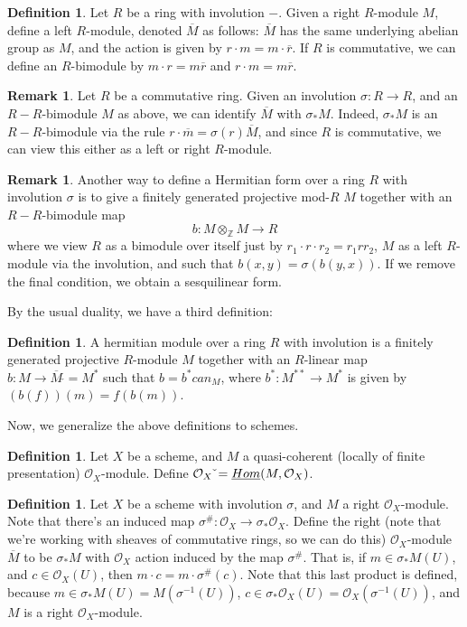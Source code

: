 \documentclass[draftthesis,tocnosub,noragright,centerchapter,10pt]{uiucthesis2009}
\newcommand{\Z}{\mathbb Z}
\newcommand{\mc}{\mathcal}
\newcommand{\dual}{\,\check{}}
\theoremstyle{plain}
\theoremstyle{definition}
\newtheorem{definition}[lemma]{Definition}
\newtheorem{remark}[lemma]{Remark}
\begin{document}
\begin{definition}
Let $R$ be a ring with involution $-$. Given a right $R$-module $M$, define
a left $R$-module, denoted $\overline M$ as follows: $\overline M$ has the same underlying abelian
group as $M$, and the action is given by $r \cdot m = m \cdot \overline r$. If $R$ is
commutative, we can define an $R$-bimodule by $m \cdot r =
m \overline r$ and $r \cdot m = m \overline r$. 
\end{definition}

\begin{remark}
Let $R$ be a commutative ring. Given an involution $\sigma : R \rightarrow R$, and an $R-R$-bimodule
$M$ as above, we can identify $\overline M$ with $\sigma_*M$. Indeed,
$\sigma_*M$ is an $R-R$-bimodule via the rule $r \cdot \overline m =
\sigma(r)\overline M$, and since $R$ is commutative, we can view this
either as a left or right $R$-module. 
\end{remark}

\begin{remark}
Another way to define a Hermitian form over a ring $R$ with involution
$\sigma$ is to give a finitely generated projective mod-$R$ $M$ together
with an $R-R$-bimodule map  
\[
b :  M \otimes_{\Z}  M \rightarrow R
\]
where we view $R$ as a
bimodule over itself just by $r_1 \cdot r \cdot r_2 = r_1rr_2$, $M$ as
a left $R$-module via the involution, and such that $b(x,y) = \sigma(b(y,x))$. If we remove the final
condition, we obtain a sesquilinear form. 
\end{remark}

By the usual duality, we have a third definition:

\begin{definition}
A
hermitian module over a ring $R$ with involution is a finitely
generated projective $R$-module $M$ together with an $R$-linear map $b : M
\rightarrow \overline{M}\dual = M^*$ such that $b = b^*can_M$, where
$b^* : M^{**} \rightarrow M^*$ is given by $(b(f))(m) = f(b(m))$.
\end{definition}

Now, we generalize the above definitions to schemes.

\begin{definition}
Let $X$ be a scheme, and $M$ a quasi-coherent (locally of finite presentation) $\mc O_X$-module. Define $\mc O_X\dual
= \uline{Hom}(M,\mc O_X)$.
\end{definition}

\begin{definition}
Let $X$ be a scheme with involution $\sigma$, and $M$ a right $\mc
O_X$-module. Note that there's an induced map $\sigma^{\#} : \mc O_X
\rightarrow \sigma_*\mc O_X$. Define the right (note that we're
working with sheaves of commutative rings, so we can do this) $\mc O_X$-module $\overline
M$ to be $\sigma_*M$ with $\mc O_X$ action induced by the map
$\sigma^{\#}$. That is, if $m \in \sigma_*M(U)$, and $c \in \mc
O_X(U)$, then $m \cdot c = m \cdot \sigma^{\#}(c)$. Note that this
last product is defined, because $m \in \sigma_*M(U) =
M(\sigma^{-1}(U))$, $c \in \sigma_*\mc O_X(U) = \mc
O_X(\sigma^{-1}(U))$, and $M$ is a right $\mc O_X$-module. 
\end{definition}
\end{document}
